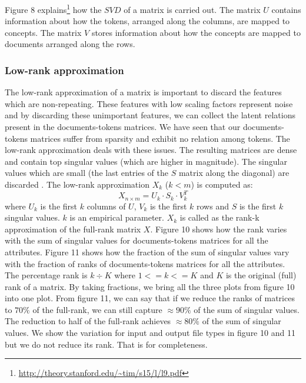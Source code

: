 Figure 8 explains\footnote{\url{http://theory.stanford.edu/~tim/s15/l/l9.pdf}} how the $SVD$ of a matrix is carried out. The matrix $U$ contains information about how the tokens, arranged along the columns, are mapped to concepts. The matrix $V$ stores information about how the concepts are mapped to documents arranged along the rows.

\subsubsection{Low-rank approximation}
The low-rank approximation of a matrix is important to discard the features which are non-repeating. These features with low scaling factors represent noise and by discarding these unimportant features, we can collect the latent relations present in the documents-tokens matrices. We have seen that our documents-tokens matrices suffer from sparsity and exhibit no relation among tokens. The low-rank approximation deals with these issues. The resulting matrices are dense and contain top singular values (which are higher in magnitude). The singular values which are small (the last entries of the $S$ matrix along the diagonal) are discarded \cite{DBLP:journals/corr/Yang15b}. The low-rank approximation $X_k$ ($k<m$) is computed as:
    \begin{equation}
    X_{n \times m} = U_{k} \cdot S_{k} \cdot V_{k}^T
    \end{equation}
    where $U_{k}$ is the first $k$ columns of $U$, $V_{k}$ is the first $k$ rows and $S$ is the first $k$ singular values. $k$ is an empirical parameter. $X_k$ is called as the rank-k approximation of the full-rank matrix $X$. Figure 10 shows how the rank varies with the sum of singular values for documents-tokens matrices for all the attributes. Figure 11 shows how the fraction of the sum of singular values vary with the fraction of ranks of documents-tokens matrices for all the attributes. The percentage rank is $k \div K$ where $1 <= k <= K$ and $K$ is the original (full) rank of a matrix. By taking fractions, we bring all the three plots from figure 10 into one plot. From figure 11, we can say that if we reduce the ranks of matrices to $70\%$ of the full-rank, we can still capture $\approx 90\%$ of the sum of singular values. The reduction to half of the full-rank achieves $\approx 80\%$ of the sum of singular values. We show the variation for input and output file types in figure 10 and 11 but we do not reduce its rank. That is for completeness.

